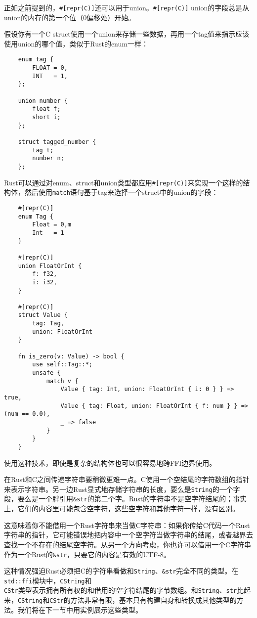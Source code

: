 正如之前提到的，\texttt{\#[repr(C)]}还可以用于union。\texttt{\#[repr(C)]} union的字段总是从union的内存的第一个位（0偏移处）开始。

假设你有一个C struct使用一个union来存储一些数据，再用一个tag值来指示应该使用union的哪个值，类似于Rust的enum一样：
\begin{verbatim}
    enum tag {
        FLOAT = 0,
        INT   = 1,
    };

    union number {
        float f;
        short i;
    };

    struct tagged_number {
        tag t;
        number n;
    };
\end{verbatim}

Rust可以通过对enum、struct和union类型都应用\texttt{\#[repr(C)]}来实现一个这样的结构体，然后使用\texttt{match}语句基于tag来选择一个struct中的union的字段：
\begin{verbatim}
    #[repr(C)]
    enum Tag {
        Float = 0,m
        Int   = 1
    }

    #[repr(C)]
    union FloatOrInt {
        f: f32,
        i: i32,
    }

    #[repr(C)]
    struct Value {
        tag: Tag,
        union: FloatOrInt
    }

    fn is_zero(v: Value) -> bool {
        use self::Tag::*;
        unsafe {
            match v {
                Value { tag: Int, union: FloatOrInt { i: 0 } } => true,
                Value { tag: Float, union: FloatOrInt { f: num } } => (num == 0.0),
                _ => false
            }
        }
    }
\end{verbatim}

使用这种技术，即使是复杂的结构体也可以很容易地跨FFI边界使用。

在Rust和C之间传递字符串要稍微更难一点。C使用一个空结尾的字符数组的指针来表示字符串。另一边Rust显式地存储字符串的长度，要么是\texttt{String}的一个字段，要么是一个胖引用\texttt{\&str}的第二个字。Rust的字符串不是空字符结尾的；事实上，它们的内容里可能包含空字符，这些空字符和其他字符一样，没有区别。

这意味着你不能借用一个Rust字符串来当做C字符串：如果你传给C代码一个Rust字符串的指针，它可能错误地把内容中一个空字符当做字符串的结尾，或者越界去查找一个不存在的结尾空字符。从另一个方向考虑，你也许可以借用一个C字符串作为一个Rust的\texttt{\&str}，只要它的内容是有效的UTF-8。

这种情况强迫Rust必须把C的字符串看做和\texttt{String}、\texttt{\&str}完全不同的类型。在\texttt{std::ffi}模块中，\texttt{CString}和\\
\texttt{CStr}类型表示拥有所有权的和借用的空字符结尾的字节数组。和\texttt{String}、\texttt{str}比起来，\texttt{CString}和\texttt{CStr}的方法非常有限，基本只有构建自身和转换成其他类型的方法。我们将在下一节中用实例展示这些类型。

